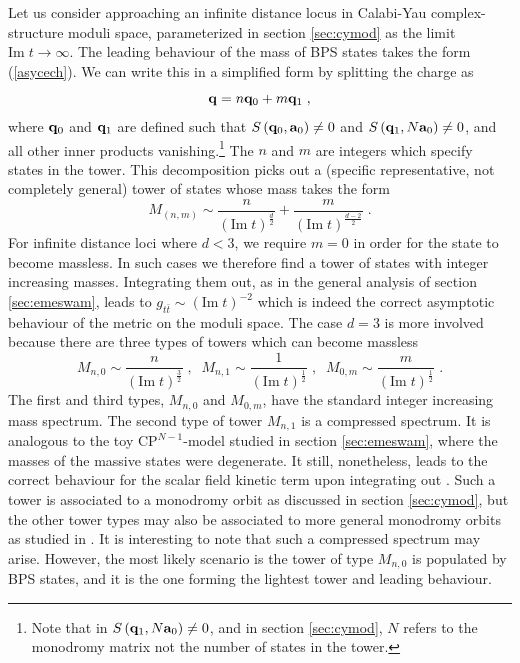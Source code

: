 \documentclass[11pt,a4paper]{article}
\numberwithin{equation}{section}
\numberwithin{table}{section}\setlength{\multlinegap}{25pt}
\newcommand{\be}{\begin{equation}}
\newcommand{\ee}{\end{equation}}
\begin{document}
{Let us consider approaching an infinite distance locus in Calabi-Yau complex-structure moduli space, parameterized in section \ref{sec:cymod} as the limit $\mathrm{Im\;}t \rightarrow \infty$. The leading behaviour of the mass of BPS states takes the form (\ref{asycech}). We can write this in a simplified form by splitting the charge as
\be
{\bf q} = n {\bf q}_0 + m {\bf q}_1 \;,
\ee
where ${\bf q}_0$ and ${\bf q}_1$ are defined such that $S\left({\bf q}_0,{\bf a}_0 \right) \neq 0$ and $S\left({\bf q}_1,N{\bf a}_0 \right) \neq 0$, and all other inner products vanishing.\footnote{Note that in $S\left({\bf q}_1,N{\bf a}_0 \right) \neq 0$, and in section \ref{sec:cymod}, $N$ refers to the monodromy matrix not the number of states in the tower.} The $n$ and $m$ are integers which specify states in the tower. This decomposition picks out a (specific representative, not completely general) tower of states whose mass takes the form
\be
M_{(n,m)} \sim \frac{n}{\left(\mathrm{Im\;}t \right)^{\frac{d}{2}}} + \frac{m}{\left(\mathrm{Im\;}t \right)^{\frac{d-2}{2}}} \;.
\ee
For infinite distance loci where $d < 3$, we require $m=0$ in order for the state to become massless. In such cases we therefore find a tower of states with integer increasing masses. Integrating them out, as in the general analysis of section \ref{sec:emeswam}, leads to $g_{t\bar{t}} \sim \left(\mathrm{Im\;}t \right)^{-2}$ which is indeed the correct asymptotic behaviour of the metric on the moduli space. The case $d=3$ is more involved because there are three types of towers which can become massless
\be
M_{n,0} \sim \frac{n}{\left(\mathrm{Im\;}t \right)^{\frac{3}{2}}} \;,\;\; M_{n,1} \sim \frac{1}{\left(\mathrm{Im\;}t \right)^{\frac{1}{2}}}  \;, \;\; M_{0,m} \sim \frac{m}{\left(\mathrm{Im\;}t \right)^{\frac{1}{2}}} \;.
\ee
The first and third types, $M_{n,0}$ and $M_{0,m}$, have the standard integer increasing mass spectrum. The second type of tower $ M_{n,1}$ is a compressed spectrum. It is analogous to the toy $\mathrm{CP}^{N-1}$-model studied in section \ref{sec:emeswam}, where the masses of the massive states were degenerate. It still, nonetheless, leads to the correct behaviour for the scalar field kinetic term upon integrating out \cite{Grimm:2018ohb}. Such a tower is associated to a monodromy orbit as discussed in section \ref{sec:cymod}, but the other tower types may also be associated to more general monodromy orbits as studied in \cite{Grimm:2018cpv}. It is interesting to note that such a compressed spectrum may arise. However, the most likely scenario is the tower of type $M_{n,0}$ is populated by BPS states, and it is the one forming the lightest tower and leading behaviour.

}
\end{document}

